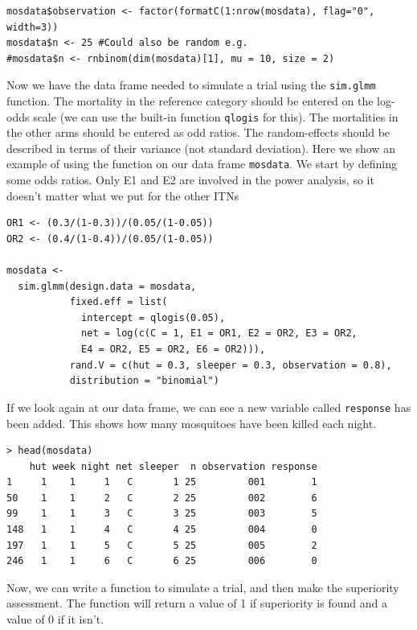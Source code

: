 \documentclass[11pt]{article}
\begin{document}
\begin{verbatim}
mosdata$observation <- factor(formatC(1:nrow(mosdata), flag="0", width=3))
mosdata$n <- 25 #Could also be random e.g. 
#mosdata$n <- rnbinom(dim(mosdata)[1], mu = 10, size = 2)
\end{verbatim}
Now we have the data frame needed to simulate a trial using the \verb+sim.glmm+ function. The mortality in the reference category should be entered on the log-odds scale (we can use the built-in function \verb+qlogis+ for this). The mortalities in the other arms should be entered as odd ratios. The random-effects should be described in terms of their variance (not standard deviation). Here we show an example of using the function on our data frame \verb+mosdata+. We start by defining some odds ratios. Only E1 and E2 are involved in the power analysis, so it doesn't matter what we put for the other ITNs
\begin{verbatim}
OR1 <- (0.3/(1-0.3))/(0.05/(1-0.05))
OR2 <- (0.4/(1-0.4))/(0.05/(1-0.05))

mosdata <- 
  sim.glmm(design.data = mosdata,
           fixed.eff = list(
             intercept = qlogis(0.05),
             net = log(c(C = 1, E1 = OR1, E2 = OR2, E3 = OR2,
             E4 = OR2, E5 = OR2, E6 = OR2))),
           rand.V = c(hut = 0.3, sleeper = 0.3, observation = 0.8),
           distribution = "binomial")
\end{verbatim}
If we look again at our data frame, we can see a new variable called \verb+response+ has been added. This shows how many mosquitoes have been killed each night.
\begin{verbatim}
> head(mosdata)
    hut week night net sleeper  n observation response
1     1    1     1   C       1 25         001        1
50    1    1     2   C       2 25         002        6
99    1    1     3   C       3 25         003        5
148   1    1     4   C       4 25         004        0
197   1    1     5   C       5 25         005        2
246   1    1     6   C       6 25         006        0
\end{verbatim}
Now, we can write a function to simulate a trial, and then make the superiority assessment. The function will return a value of 1 if superiority is found and a value of 0 if it isn't.
\end{document}
